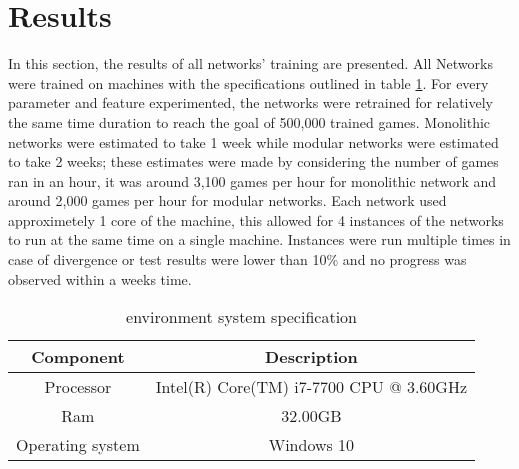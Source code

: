 \documentclass[12pt,a4paper]{article}
\begin{document}
\section{Results}
In this section, the results of all networks' training are presented. All Networks were trained on machines with the specifications outlined in table \ref{spec}. For every parameter and feature experimented, the networks were retrained  for relatively the same time duration to reach the goal of 500,000 trained games. Monolithic networks were estimated to take 1 week while modular networks were estimated to take 2 weeks; these estimates were made by considering the number of games ran in an hour, it was around 3,100 games per hour for monolithic network and around 2,000 games per hour for modular networks. Each network used approximetely 1 core of the machine, this allowed for 4 instances of the networks to run at the same time on a single machine. Instances were run multiple times in case of divergence or test results were lower than 10\% and no progress was observed within a weeks time.
\begin{table}[htb]
    \centering
    \caption{environment system specification}
    \label{spec}
    \begin{tabular}{cc}
        \hline
        \hline
        Component & Description \\ 
        \hline
        Processor & Intel(R) Core(TM) i7-7700 CPU @ 3.60GHz \\ 
        \hline
        Ram & 32.00GB \\ 
        \hline
        Operating system & Windows 10 \\ 
        \hline
    \end{tabular}
\end{table}
\end{document}
